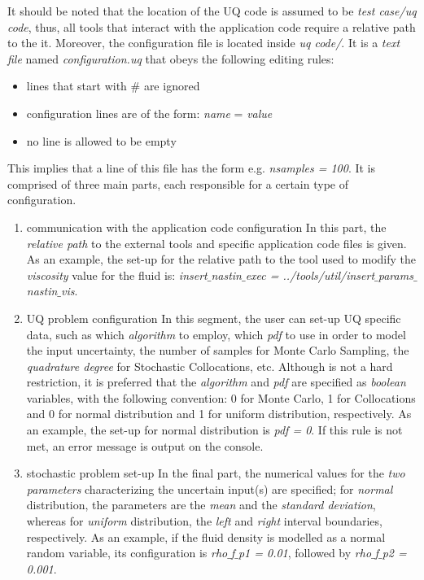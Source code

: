 	It should be noted that the location of the UQ code is assumed to be \emph{test case/uq code}, thus, all tools that interact with the application code require a relative path to the it. Moreover, the configuration file is located inside \emph{uq code/}. It is a \emph{text file} named \emph{configuration.uq} that obeys the following editing rules:
\begin{itemize}
\item lines that start with $\#$ are ignored
\item configuration lines are of the form: \emph{name} = \emph{value}
\item no line is allowed to be empty
\end{itemize}
	This implies that a line of this file has the form e.g. \emph{nsamples = 100}. It is comprised of three main parts, each responsible for a certain type of configuration.
\begin{enumerate}
\item communication with the application code configuration \newline
In this part, the \emph{relative path} to the external tools and specific application code files is given. As an example, the set-up for the relative path to the tool used to modify the \emph{viscosity} value for the fluid is: \emph{insert$\_$nastin$\_$exec = ../tools/util/insert$\_$params$\_$nastin$\_$vis}. 
\item UQ problem configuration \newline
In this segment, the user can set-up UQ specific data, such as which \emph{algorithm} to employ, which \emph{pdf} to use in order to model the input uncertainty, the number of samples for Monte Carlo Sampling, the \emph{quadrature degree} for Stochastic Collocations, etc. Although is not a hard restriction, it is preferred that the \emph{algorithm} and \emph{pdf} are specified as \emph{boolean} variables, with the following convention: 0 for Monte Carlo, 1 for Collocations and 0 for normal distribution and 1 for uniform distribution, respectively. As an example, the set-up for normal distribution is \emph{pdf = 0}. If this rule is not met, an error message is output on the console.
\item stochastic problem set-up \newline
In the final part, the numerical values for the \emph{two parameters} characterizing the uncertain input(s) are specified; for \emph{normal} distribution, the parameters are the \emph{mean} and the \emph{standard deviation}, whereas for \emph{uniform} distribution, the \emph{left} and \emph{right} interval boundaries, respectively. As an example, if the fluid density is modelled as a normal random variable, its configuration is \emph{rho$\_$f$\_$p1 = 0.01}, followed by  \emph{rho$\_$f$\_$p2 = 0.001}.
\end{enumerate}
		
